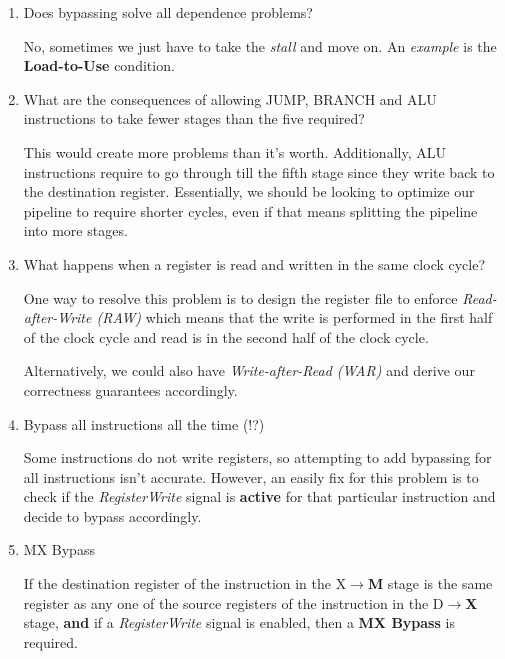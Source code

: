 \documentclass[12pt]{article}
\newenvironment{QandA}{\begin{enumerate}[label=\bfseries\arabic*.]\bfseries}
                      {\end{enumerate}}
\newenvironment{answered}{\par\quad\normalfont}{}
\begin{document}
\begin{QandA}
   \item Does bypassing solve all dependence problems?
   \begin{answered}
   No, sometimes we just have to take the \textit{stall} and move on. An \textit{example} is the \textbf{Load-to-Use} condition. 
   \end{answered}
   
   \item What are the consequences of allowing JUMP, BRANCH and ALU instructions to take fewer stages than the five required?
   \begin{answered}
   This would create more problems than it's worth. Additionally, ALU instructions require to go through till the fifth stage since they write back to the destination register. Essentially, we should be looking to optimize our pipeline to require shorter cycles, even if that means splitting the pipeline into more stages.
   \end{answered}
   
   \item What happens when a register is read and written in the same clock cycle?
   \begin{answered}
   One way to resolve this problem is to design the register file to enforce \textit{Read-after-Write (RAW)} which means that the write is performed in the first half of the clock cycle and read is in the second half of the clock cycle. 
   
   Alternatively, we could also have \textit{Write-after-Read (WAR)} and derive our correctness guarantees accordingly. 
   \end{answered}
   
   \item Bypass all instructions all the time (!?)
   \begin{answered}
   Some instructions do not write registers, so attempting to add bypassing for all instructions isn't accurate. However, an easily fix for this problem is to check if the \textit{RegisterWrite} signal is \textbf{active} for that particular instruction and decide to bypass accordingly. 
   \end{answered}
   
   \item MX Bypass
   \begin{answered}
   If the destination register of the instruction in the X$\rightarrow$\textbf{M} stage is the same register as any one of the source registers of the instruction in the D$\rightarrow$\textbf{X} stage, \textbf{and} if a \textit{RegisterWrite} signal is enabled, then a \textbf{MX Bypass} is required.  
   

\end{answered}
\end{QandA}
\end{document}
